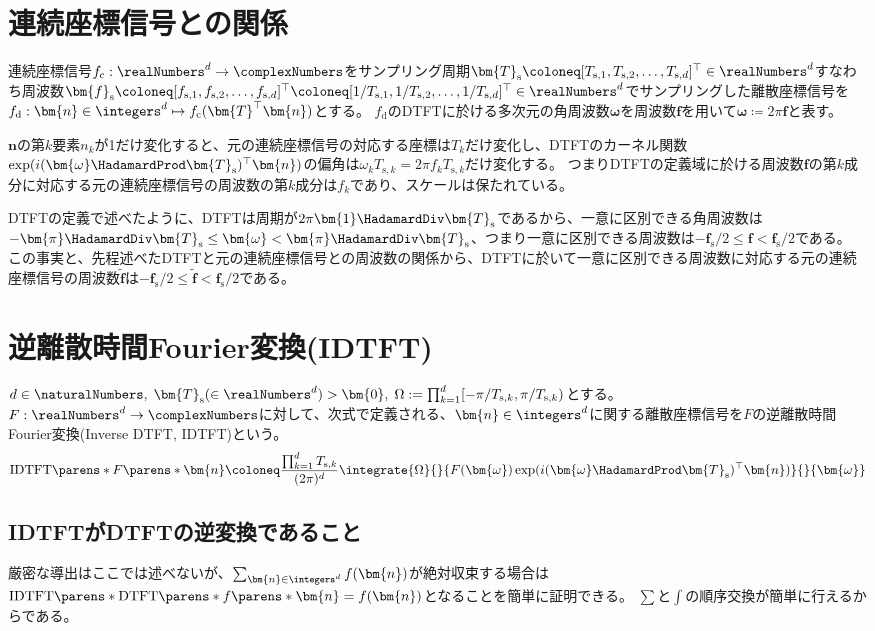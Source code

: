     \section{連続座標信号との関係}
        連続座標信号$f_\text{c}:\realNumbers^d\to\complexNumbers$をサンプリング周期$\bm{T}_\text{s} \coloneq [T_{\text{s},1}, T_{\text{s},2}, \dotsc, T_{\text{s},d}]^\top\in\realNumbers^d$すなわち周波数$\bm{f}_\text{s} \coloneq [f_{\text{s},1}, f_{\text{s},2}, \dotsc, f_{\text{s},d}]^\top \coloneq [1/T_{\text{s},1}, 1/T_{\text{s},2}, \dotsc, 1/T_{\text{s},d}]^\top\in\realNumbers^d$でサンプリングした離散座標信号を$f_\text{d}: \bm{n}\in\integers^d\mapsto f_\text{c}(\bm{T}^\top\bm{n})$とする。
        $f_\text{d}$のDTFTに於ける多次元の角周波数$\bm{\omega}$を周波数$\bm{f}$を用いて$\bm{\omega} \coloneq 2\pi\bm{f}$と表す。
        \par
        $\bm{n}$の第$k$要素$n_k$が1だけ変化すると、元の連続座標信号の対応する座標は$T_k$だけ変化し、DTFTのカーネル関数$\exp(i(\bm{\omega}\HadamardProd\bm{T}_\text{s})^\top\bm{n})$の偏角は$\omega_k T_{\text{s},k} = 2\pi f_k T_{\text{s},k}$だけ変化する。
        つまりDTFTの定義域に於ける周波数$\bm{f}$の第$k$成分に対応する元の連続座標信号の周波数の第$k$成分は$f_k$であり、スケールは保たれている。
        \par
        DTFTの定義で述べたように、DTFTは周期が$2\pi\bm{1}\HadamardDiv\bm{T}_\text{s}$であるから、一意に区別できる角周波数は$-\bm{\pi}\HadamardDiv\bm{T}_\text{s} \leq \bm{\omega} < \bm{\pi}\HadamardDiv\bm{T}_\text{s}$、つまり一意に区別できる周波数は$-\bm{f}_\text{s}/2 \leq \bm{f} < \bm{f}_\text{s}/2$である。
        この事実と、先程述べたDTFTと元の連続座標信号との周波数の関係から、DTFTに於いて一意に区別できる周波数に対応する元の連続座標信号の周波数$\tilde{\bm{f}}$は$-\bm{f}_\text{s}/2 \leq \tilde{\bm{f}} < \bm{f}_\text{s}/2$である。
    \section{逆離散時間Fourier変換(IDTFT)}
        $d\in\naturalNumbers,\;\bm{T}_\text{s}(\in\realNumbers^d)>\bm{0},\;\Omega := \prod_{k=1}^d [-\pi/T_{\text{s},k},\pi/T_{\text{s},k})$とする。
        $F:\realNumbers^d\to\complexNumbers$に対して、次式で定義される、$\bm{n}\in\integers^d$に関する離散座標信号を$F$の逆離散時間Fourier変換(Inverse DTFT, IDTFT)という。
        \[ \IDTFTwithArg{F}{\bm{n}} \coloneq \frac{\prod_{k=1}^d T_{\text{s},k}}{(2\pi)^d}\integrate{\Omega}{}{F(\bm{\omega})\exp(i(\bm{\omega}\HadamardProd\bm{T}_\text{s})^\top\bm{n})}{}{\bm{\omega}} \]
        \subsection{IDTFTがDTFTの逆変換であること}
            厳密な導出はここでは述べないが、$\sum_{\bm{n}\in\integers^d} f(\bm{n})$が絶対収束する場合は$\IDTFTwithArg{\DTFT{f}}{\bm{n}} = f(\bm{n})$となることを簡単に証明できる。
            $\sum$と$\int$の順序交換が簡単に行えるからである。
